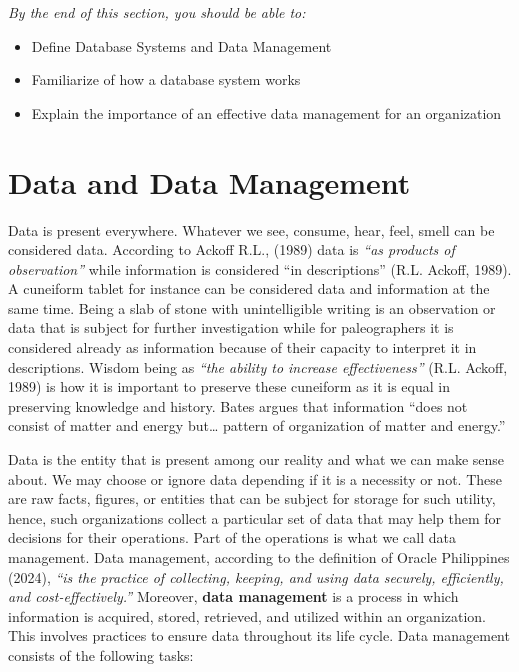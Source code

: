 \documentclass[
  letterpaper,
  DIV=11,
  numbers=noendperiod]{scrreprt}
\providecommand{\tightlist}{%
  \setlength{\itemsep}{0pt}\setlength{\parskip}{0pt}}\usepackage{longtable,booktabs,array}
\begin{document}
\emph{By the end of this section, you should be able to:}

\begin{itemize}
\tightlist
\item
  Define Database Systems and Data Management
\item
  Familiarize of how a database system works
\item
  Explain the importance of an effective data management for an
  organization
\end{itemize}

\section{Data and Data Management}\label{data-and-data-management}

Data is present everywhere. Whatever we see, consume, hear, feel, smell
can be considered data. According to Ackoff R.L., (1989) data is
\emph{``as products of observation''} while information is considered
``in descriptions'' (R.L. Ackoff, 1989). A cuneiform tablet for instance
can be considered data and information at the same time. Being a slab of
stone with unintelligible writing is an observation or data that is
subject for further investigation while for paleographers it is
considered already as information because of their capacity to interpret
it in descriptions. Wisdom being as \emph{``the ability to increase
effectiveness''} (R.L. Ackoff, 1989) is how it is important to preserve
these cuneiform as it is equal in preserving knowledge and history.
Bates argues that information ``does not consist of matter and energy
but\ldots{} pattern of organization of matter and energy.''

Data is the entity that is present among our reality and what we can
make sense about. We may choose or ignore data depending if it is a
necessity or not. These are raw facts, figures, or entities that can be
subject for storage for such utility, hence, such organizations collect
a particular set of data that may help them for decisions for their
operations. Part of the operations is what we call data management. Data
management, according to the definition of Oracle Philippines (2024),
\emph{``is the practice of collecting, keeping, and using data securely,
efficiently, and cost-effectively.''} Moreover, \textbf{data management}
is a process in which information is acquired, stored, retrieved, and
utilized within an organization. This involves practices to ensure data
throughout its life cycle. Data management consists of the following
tasks:
\end{document}
